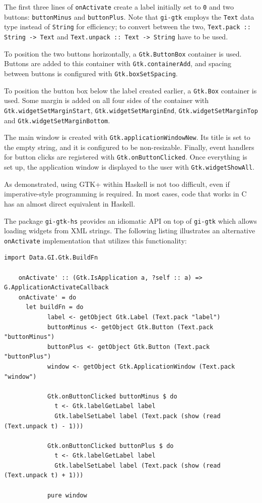 \documentclass[UdineBachThesis,american,11pt]{PhdThesis}
\begin{document}
  The first three lines of \mbox{\texttt{onActivate}} create a label initially
  set to \texttt{0} and two buttons: \mbox{\texttt{buttonMinus}} and
  \mbox{\texttt{buttonPlus}}. Note that \mbox{\texttt{gi-gtk}} employs the
  \mbox{\texttt{Text}} data type instead of \mbox{\texttt{String}} for
  efficiency; to convert between the two,
  \mbox{\texttt{Text.pack :: String -> Text}} and
  \mbox{\texttt{Text.unpack :: Text -> String}} have to be used.

  To position the two buttons horizontally, a \mbox{\texttt{Gtk.ButtonBox}}
  container is used. Buttons are added to this container with
  \mbox{\texttt{Gtk.containerAdd}}, and spacing between buttons is configured
  with \mbox{\texttt{Gtk.boxSetSpacing}}.

  To position the button box below the label created earlier, a
  \mbox{\texttt{Gtk.Box}} container is used. Some margin is added on all four
  sides of the container with \mbox{\texttt{Gtk.widgetSetMarginStart}},
  \mbox{\texttt{Gtk.widgetSetMarginEnd}}, \mbox{\texttt{Gtk.widgetSetMarginTop}}
  and \mbox{\texttt{Gtk.widgetSetMarginBottom}}.

  The main window is created with \mbox{\texttt{Gtk.applicationWindowNew}}. Its
  title is set to the empty string, and it is configured to be non-resizable.
  Finally, event handlers for button clicks are registered with
  \mbox{\texttt{Gtk.onButtonClicked}}. Once everything is set up, the
  application window is displayed to the user with
  \mbox{\texttt{Gtk.widgetShowAll}}.

  As demonstrated, using GTK+ within Haskell is not too difficult, even if
  imperative-style programming is required. In most cases, code that works in C
  has an almost direct equivalent in Haskell.

  The package \mbox{\texttt{gi-gtk-hs}} provides an idiomatic API on top of
  \mbox{\texttt{gi-gtk}} which allows loading widgets from XML strings. The
  following listing illustrates an alternative \mbox{\texttt{onActivate}}
  implementation that utilizes this functionality:

  \begin{Verbatim}[gobble=4,fontsize=\small]
    import Data.GI.Gtk.BuildFn

    onActivate' :: (Gtk.IsApplication a, ?self :: a) => G.ApplicationActivateCallback
    onActivate' = do
      let buildFn = do
            label <- getObject Gtk.Label (Text.pack "label")
            buttonMinus <- getObject Gtk.Button (Text.pack "buttonMinus")
            buttonPlus <- getObject Gtk.Button (Text.pack "buttonPlus")
            window <- getObject Gtk.ApplicationWindow (Text.pack "window")

            Gtk.onButtonClicked buttonMinus $ do
              t <- Gtk.labelGetLabel label
              Gtk.labelSetLabel label (Text.pack (show (read (Text.unpack t) - 1)))

            Gtk.onButtonClicked buttonPlus $ do
              t <- Gtk.labelGetLabel label
              Gtk.labelSetLabel label (Text.pack (show (read (Text.unpack t) + 1)))

            pure window
  \end{Verbatim}
\end{document}
